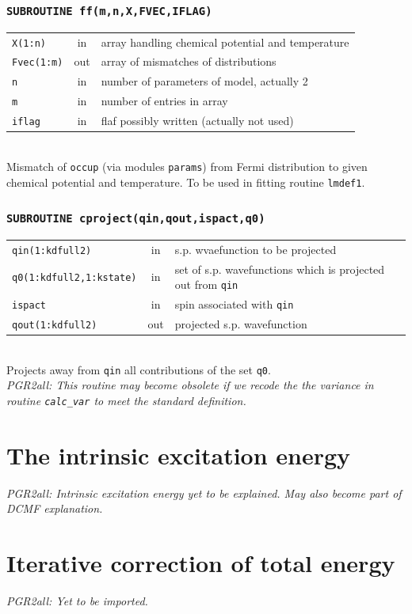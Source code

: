 \documentclass[final,1p]{elsarticle}
\newcommand{\PGRcomm}[1]{{\color{blue}\small\em PGR2all: #1}}
\begin{document}
\subsubsection*{\tt SUBROUTINE ff(m,n,X,FVEC,IFLAG)}
\begin{tabular}{lcl}
 {\tt X(1:n)} & in & array handling chemical potential and temperature\\
 {\tt Fvec(1:m)} & out & array of mismatches of distributions\\
 {\tt n} & in & number of parameters of model, actually 2\\
 {\tt m} & in & number of entries in array\\
 {\tt iflag} & in & flaf possibly written (actually not used)\\
\end{tabular}
\\[4pt]
Mismatch of {\tt occup} (via modules {\tt params}) from Fermi
distribution to given chemical potential and temperature. To be used
in fitting routine {\tt lmdef1}.


\subsubsection*{\tt SUBROUTINE cproject(qin,qout,ispact,q0)}
\begin{tabular}{lcl}
 {\tt qin(1:kdfull2)} & in & s.p. wvaefunction to be projected\\
 {\tt q0(1:kdfull2,1:kstate)} & in & set of s.p. wavefunctions which
 is projected out from {\tt qin}\\
 {\tt ispact} & in & spin associated with {\tt qin}\\
 {\tt qout(1:kdfull2)} & out & projected s.p. wavefunction \\
\end{tabular}
\\[4pt] Projects away from {\tt qin} all contributions of the set 
{\tt q0}.  
\\ 
\PGRcomm{This routine may become obsolete if we recode the
  the variance in routine {\tt calc\_var} to meet the
  standard definition.}


\appendix

\section{The intrinsic excitation energy}
\label{app:eintr}


\PGRcomm{Intrinsic excitation energy yet to be explained. May also
  become part of DCMF explanation.}


\section{Iterative correction of total energy}
\label{sec:corriter}


\PGRcomm{Yet to be imported.}

                                                        
             
\end{document}
